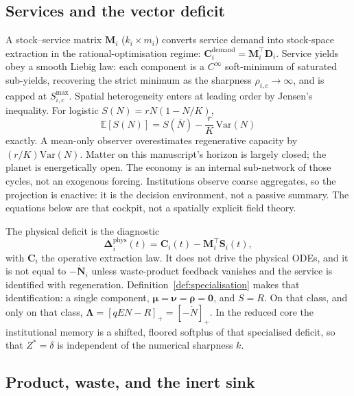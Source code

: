 \documentclass[11pt]{article}
\theoremstyle{definition}
\begin{document}
\subsection{Services and the vector deficit}

A stock--service matrix $\mathbf M_i$ ($k_i\times m_i$) converts service demand into stock-space extraction in the rational-optimisation regime: $\mathbf C_i^{\mathrm{demand}}=\mathbf M_i^\top\mathbf D_i$. Service yields obey a smooth Liebig law: each component is a $C^\infty$ soft-minimum of saturated sub-yields, recovering the strict minimum as the sharpness $\rho_{i,c}\to\infty$, and is capped at $S_{i,c}^{\max}$. Spatial heterogeneity enters at leading order by Jensen's inequality. For logistic $S(N)=rN(1-N/K)$,
\begin{equation}
\mathbb E[S(N)]=S(\bar N)-\frac{r}{K}\,\mathrm{Var}(N)
\end{equation}
exactly. A mean-only observer overestimates regenerative capacity by $(r/K)\mathrm{Var}(N)$. Matter on this manuscript's horizon is largely closed; the planet is energetically open. The economy is an internal sub-network of those cycles, not an exogenous forcing. Institutions observe coarse aggregates, so the projection is enactive: it is the decision environment, not a passive summary. The equations below are that cockpit, not a spatially explicit field theory.

The physical deficit is the diagnostic
\begin{equation}
\boldsymbol\Delta_i^{\mathrm{phys}}(t)=\mathbf C_i(t)-\mathbf M_i^\top\mathbf S_i(t),
\label{eq:deficit-phys}
\end{equation}
with $\mathbf C_i$ the operative extraction law. It does not drive the physical ODEs, and it is not equal to $-\dot{\mathbf N}_i$ unless waste-product feedback vanishes and the service is identified with regeneration. Definition~\ref{def:specialisation} makes that identification: a single component, $\boldsymbol\mu=\boldsymbol\nu=\boldsymbol\rho=\mathbf 0$, and $S=R$. On that class, and only on that class, $\boldsymbol\Lambda=[qEN-R]_+=[-\dot N]_+$. In the reduced core the institutional memory is a shifted, floored softplus of that specialised deficit, so that $Z^*=\delta$ is independent of the numerical sharpness $k$.

\subsection{Product, waste, and the inert sink}
\label{sec:waste-loop}
\end{document}
